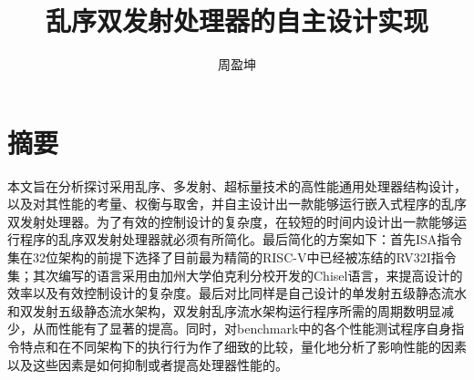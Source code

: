 \confidential{}%
\title{乱序双发射处理器的自主设计实现}%
\author{周盈坤}%
\advisorsec{}%
\maketitle%
\makeenglishtitle%
\makedeclaration%
\chapter*{摘\quad 要}%
\setcounter{page}{1}%
本文旨在分析探讨采用乱序、多发射、超标量技术的高性能通用处理器结构设计，以及对其性能的考量、权衡与取舍，并自主设计出一款能够运行嵌入式程序的乱序双发射处理器。为了有效的控制设计的复杂度，在较短的时间内设计出一款能够运行程序的乱序双发射处理器就必须有所简化。最后简化的方案如下：首先ISA指令集在32位架构的前提下选择了目前最为精简的RISC-V中已经被冻结的RV32I指令集；其次编写的语言采用由加州大学伯克利分校开发的Chisel语言，来提高设计的效率以及有效控制设计的复杂度。最后对比同样是自己设计的单发射五级静态流水和双发射五级静态流水架构，双发射乱序流水架构运行程序所需的周期数明显减少，从而性能有了显著的提高。同时，对benchmark中的各个性能测试程序自身指令特点和在不同架构下的执行行为作了细致的比较，量化地分析了影响性能的因素以及这些因素是如何抑制或者提高处理器性能的。

